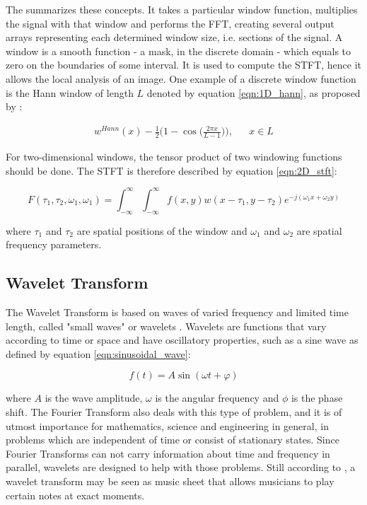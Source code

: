 The  summarizes these concepts. It takes a particular window function, multiplies the signal with that window and performs the FFT, creating several output arrays representing each determined window size, i.e. sections of the signal. A window is a smooth function - a mask, in the discrete domain - which equals to zero on the boundaries of some interval. It is used to compute the STFT, hence it allows the local analysis of an image. One example of a discrete window function is the Hann window of length $L$ denoted by equation \ref{eqn:1D_hann}, as proposed by :

\begin{align}
\label{eqn:1D_hann}
    w^{Hann}(x) - \frac{1}{2}
    \Bigg(
        1 - \cos\Bigg({\frac{2 \pi x}{L - 1}}\Bigg)
    \Bigg),
    &&
    x \in L
\end{align}

\noindent For two-dimensional windows, the tensor product of two windowing functions should be done. The STFT is therefore described by  equation \ref{eqn:2D_stft}:

\begin{equation}
\label{eqn:2D_stft}
    F(\tau_{1},\tau_{2},\omega_{1},\omega_{1}) = \int_{-\infty}^{\infty}\int_{-\infty}^{\infty}f(x,y)w(x-\tau_{1},y-\tau_{2}) e^{-j(\omega_{1}x + \omega_{2}y)}
\end{equation}

\noindent where $\tau_{1}$ and $\tau_{2}$ are spatial positions of the window and $\omega_{1}$ and $\omega_{2}$ are spatial frequency parameters.

\subsection{Wavelet Transform}

The Wavelet Transform is based on waves of varied frequency and limited time length, called "small waves" or wavelets \cite{gonzalez2008digital}.  Wavelets are functions that vary according to time or space and have oscillatory properties, such as a sine wave as defined by equation \ref{eqn:sinusoidal_wave}:

\begin{equation}
\label{eqn:sinusoidal_wave}    
    f(t) = A \sin{(\omega t + \varphi)}
\end{equation}

\noindent where $A$ is the wave amplitude, $\omega$ is the angular frequency and $\phi$ is the phase shift. The Fourier Transform also deals with this type of problem, and it is of utmost importance for mathematics, science and engineering
in general, in problems which are independent of time or consist of stationary states. Since Fourier Transforms can not carry information about time and frequency in parallel, wavelets are designed to help with those problems. Still according to , a wavelet transform may be seen as music sheet  that allows musicians to play certain notes at exact moments. 

